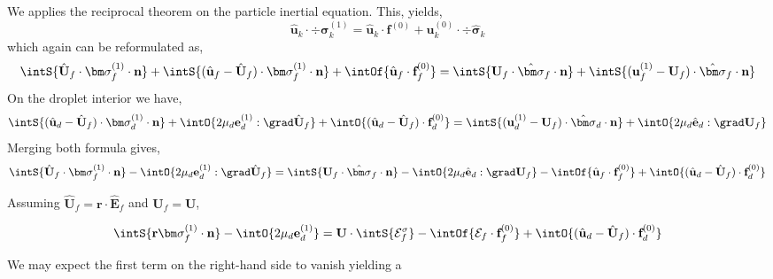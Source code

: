 We applies the reciprocal theorem on the particle inertial equation. 
This, yields, 
\begin{equation*}
    \hat{\textbf{u}}_k\cdot \div \bm\sigma_k^{(1)}
    = 
    \hat{\textbf{u}}_k\cdot \textbf{f}^{(0)}
    + \textbf{u}_k^{(0)}\cdot \div \hat{\bm\sigma}_k
\end{equation*}
which again can be reformulated as, 
\begin{equation*}
    \intS{\hat{\textbf{U}}_f\cdot  \bm\sigma_f^{(1)} \cdot \textbf{n}}
    + \intS{(\hat{\textbf{u}}_f - \hat{\textbf{U}}_f)\cdot  \bm\sigma_f^{(1)} \cdot \textbf{n}}
    + \intOf{\hat{\textbf{u}}_f\cdot  \textbf{f}_f^{(0)}}
    = 
    \intS{\textbf{U}_f\cdot  \hat{\bm\sigma}_f \cdot \textbf{n}}
    + \intS{(\textbf{u}_f^{(1)} - \textbf{U}_f)\cdot  \hat{\bm\sigma}_f \cdot \textbf{n}}
\end{equation*}
On the droplet interior we have,
\begin{equation*}
    \intS{
         (\hat{\textbf{u}}_d - \hat{\textbf{U}}_f) \cdot \bm\sigma_d^{(1)}  \cdot \textbf{n}
    }
    + \intO{2\mu_d \textbf{e}_d^{(1)} :\grad \hat{\textbf{U}}_f}
    + \intO{(\hat{\textbf{u}}_d - \hat{\textbf{U}}_f)\cdot  \textbf{f}_d^{(0)}}
    = 
    \intS{
     (\textbf{u}_d^{(1)} - \textbf{U}_f)\cdot \hat{\bm\sigma}_d \cdot \textbf{n}
    }
    +\intO{ 2\mu_d \hat{\textbf{e}}_d : \grad \textbf{U}_f}
\end{equation*}
Merging both formula gives, 
\begin{equation*}
    \intS{\hat{\textbf{U}}_f\cdot  \bm\sigma_f^{(1)} \cdot \textbf{n}}
    - \intO{2\mu_d \textbf{e}_d^{(1)} :\grad \hat{\textbf{U}}_f}
    = 
    \intS{\textbf{U}_f\cdot  \hat{\bm\sigma}_f \cdot \textbf{n}}
    -\intO{ 2\mu_d \hat{\textbf{e}}_d : \grad \textbf{U}_f}
    - \intOf{\hat{\textbf{u}}_f\cdot  \textbf{f}_f^{(0)}}
    + \intO{(\hat{\textbf{u}}_d - \hat{\textbf{U}}_f)\cdot  \textbf{f}_d^{(0)}}
\end{equation*}


Assuming $\hat{\textbf{U}}_f = \textbf{r}\cdot \hat{\textbf{E}}_f$ and $\textbf{U}_f = \textbf{U}$, 

\begin{equation*}
    \intS{\textbf{r}  \bm\sigma_f^{(1)} \cdot \textbf{n}}
    - \intO{2\mu_d \textbf{e}_d^{(1)}}
    = 
    \textbf{U}\cdot \intS{  \mathcal{E}_f^\sigma }
    - \intOf{\mathcal{E}_f \cdot  \textbf{f}_f^{(0)}}
    + \intO{(\hat{\textbf{u}}_d - \hat{\textbf{U}}_f)\cdot  \textbf{f}_d^{(0)}}
\end{equation*}

We may expect the first term on the right-hand side to vanish yielding a